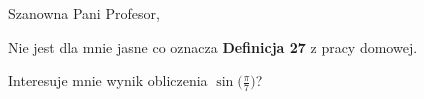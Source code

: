 \documentclass[nopagenr]{UWletterhead}
\begin{document}

\UWheader




Szanowna Pani Profesor,



Nie jest dla mnie jasne co oznacza \textbf{Definicja 27} z pracy domowej.





Interesuje mnie wynik obliczenia $\sin\big(\frac{\pi}{7}\big)$?




\end{document}
